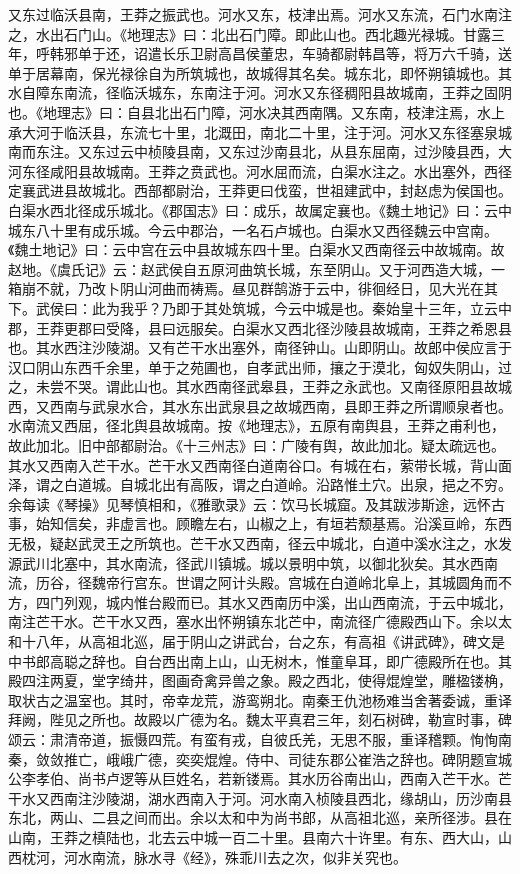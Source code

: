 \documentclass[12pt,UTF8]{ctexbook}
\begin{document}
又东过临沃县南，王莽之振武也。河水又东，枝津出焉。河水又东流，石门水南注之，水出石门山。《地理志》曰：北出石门障。即此山也。西北趣光禄城。甘露三年，呼韩邪单于还，诏遣长乐卫尉高昌侯董忠，车骑都尉韩昌等，将万六千骑，送单于居幕南，保光禄徐自为所筑城也，故城得其名矣。城东北，即怀朔镇城也。其水自障东南流，径临沃城东，东南注于河。河水又东径稠阳县故城南，王莽之固阴也。《地理志》曰：自县北出石门障，河水决其西南隅。又东南，枝津注焉，水上承大河于临沃县，东流七十里，北溉田，南北二十里，注于河。河水又东径塞泉城南而东注。又东过云中桢陵县南，又东过沙南县北，从县东屈南，过沙陵县西，大河东径咸阳县故城南。王莽之贲武也。河水屈而流，白渠水注之。水出塞外，西径定襄武进县故城北。西部都尉治，王莽更曰伐蛮，世祖建武中，封赵虑为侯国也。白渠水西北径成乐城北。《郡国志》曰：成乐，故属定襄也。《魏土地记》曰：云中城东八十里有成乐城。今云中郡治，一名石卢城也。白渠水又西径魏云中宫南。《魏土地记》曰：云中宫在云中县故城东四十里。白渠水又西南径云中故城南。故赵地。《虞氏记》云：赵武侯自五原河曲筑长城，东至阴山。又于河西造大城，一箱崩不就，乃改卜阴山河曲而祷焉。昼见群鹄游于云中，徘徊经日，见大光在其下。武侯曰：此为我乎？乃即于其处筑城，今云中城是也。秦始皇十三年，立云中郡，王莽更郡曰受降，县曰远服矣。白渠水又西北径沙陵县故城南，王莽之希恩县也。其水西注沙陵湖。又有芒干水出塞外，南径钟山。山即阴山。故郎中侯应言于汉口阴山东西千余里，单于之苑圃也，自孝武出师，攘之于漠北，匈奴失阴山，过之，未尝不哭。谓此山也。其水西南径武皋县，王莽之永武也。又南径原阳县故城西，又西南与武泉水合，其水东出武泉县之故城西南，县即王莽之所谓顺泉者也。水南流又西屈，径北舆县故城南。按《地理志》，五原有南舆县，王莽之甫利也，故此加北。旧中部都尉治。《十三州志》曰：广陵有舆，故此加北。疑太疏远也。其水又西南入芒干水。芒干水又西南径白道南谷口。有城在右，萦带长城，背山面泽，谓之白道城。自城北出有高阪，谓之白道岭。沿路惟土穴。出泉，挹之不穷。余每读《琴操》见琴慎相和，《雅歌录》云：饮马长城窟。及其跋涉斯途，远怀古事，始知信矣，非虚言也。顾瞻左右，山椒之上，有垣若颓基焉。沿溪亘岭，东西无极，疑赵武灵王之所筑也。芒干水又西南，径云中城北，白道中溪水注之，水发源武川北塞中，其水南流，径武川镇城。城以景明中筑，以御北狄矣。其水西南流，历谷，径魏帝行宫东。世谓之阿计头殿。宫城在白道岭北阜上，其城圆角而不方，四门列观，城内惟台殿而已。其水又西南历中溪，出山西南流，于云中城北，南注芒干水。芒干水又西，塞水出怀朔镇东北芒中，南流径广德殿西山下。余以太和十八年，从高祖北巡，届于阴山之讲武台，台之东，有高祖《讲武碑》，碑文是中书郎高聪之辞也。自台西出南上山，山无树木，惟童阜耳，即广德殿所在也。其殿四注两夏，堂字绮井，图画奇禽异兽之象。殿之西北，使得焜煌堂，雕楹镂桷，取状古之温室也。其时，帝幸龙荒，游鸾朔北。南秦王仇池杨难当舍著委诚，重译拜阙，陛见之所也。故殿以广德为名。魏太平真君三年，刻石树碑，勒宣时事，碑颂云：肃清帝道，振慑四荒。有蛮有戎，自彼氏羌，无思不服，重译稽颗。恂恂南秦，敛敛推亡，峨峨广德，奕奕焜煌。侍中、司徒东郡公崔浩之辞也。碑阴题宣城公李孝伯、尚书卢逻等从巨姓名，若新镂焉。其水历谷南出山，西南入芒干水。芒干水又西南注沙陵湖，湖水西南入于河。河水南入桢陵县西北，缘胡山，历沙南县东北，两山、二县之间而出。余以太和中为尚书郎，从高祖北巡，亲所径涉。县在山南，王莽之槙陆也，北去云中城一百二十里。县南六十许里。有东、西大山，山西枕河，河水南流，脉水寻《经》，殊乖川去之次，似非关究也。
\end{document}
